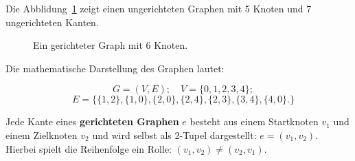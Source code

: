 \begin{mbsp}
Die Abblidung~\ref{fig:bsp:ugraph} zeigt einen ungerichteten Graphen mit 5 Knoten und 7 ungerichteten Kanten.
\end{mbsp}

\begin{figure}[htb]
\begin{center}
\caption{Ein gerichteter Graph mit 6 Knoten.
}
\label{fig:bsp:ugraph}
\end{center}
\end{figure}

Die mathematische Darstellung des Graphen lautet:

\[\quad G = (V, E); \quad V = \{0,1,2,3,4\}; \] 
\[\quad E =  \{ \{1,2\},\{1,0\},\{2,0\},\{2,4\},\{2,3\}, \{3,4\}, \{4,0\}. \}  \]

\begin{mdef}
Jede Kante eines \textbf{gerichteten Graphen} $e$ besteht aus einem Startknoten $v_1$ und einem Zielknoten $v_2$ und wird selbst als 2-Tupel dargestellt: $e= (v_1,v_2)$. 
Hierbei spielt die Reihenfolge ein Rolle: $(v_1,v_2) \neq (v_2,v_1)$. 
\end{mdef}


